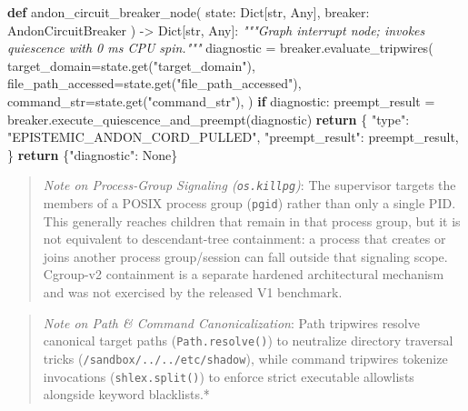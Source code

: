 \documentclass[
  10pt,letterpaper]{article}
\newenvironment{Shaded}{}{}
\newcommand{\BuiltInTok}[1]{\textcolor[rgb]{0.00,0.50,0.00}{#1}}
\newcommand{\CommentTok}[1]{\textcolor[rgb]{0.38,0.63,0.69}{\textit{#1}}}
\newcommand{\ControlFlowTok}[1]{\textcolor[rgb]{0.00,0.44,0.13}{\textbf{#1}}}
\newcommand{\KeywordTok}[1]{\textcolor[rgb]{0.00,0.44,0.13}{\textbf{#1}}}
\newcommand{\NormalTok}[1]{#1}
\newcommand{\OperatorTok}[1]{\textcolor[rgb]{0.40,0.40,0.40}{#1}}
\newcommand{\StringTok}[1]{\textcolor[rgb]{0.25,0.44,0.63}{#1}}
\newcommand{\VariableTok}[1]{\textcolor[rgb]{0.10,0.09,0.49}{#1}}
\begin{document}
\begin{Shaded}
\begin{Highlighting}[]
\KeywordTok{def}\NormalTok{ andon\_circuit\_breaker\_node(}
\NormalTok{    state: Dict[}\BuiltInTok{str}\NormalTok{, Any], breaker: AndonCircuitBreaker}
\NormalTok{) }\OperatorTok{{-}\textgreater{}}\NormalTok{ Dict[}\BuiltInTok{str}\NormalTok{, Any]:}
    \CommentTok{"""Graph interrupt node; invokes quiescence with 0 ms CPU spin."""}
\NormalTok{    diagnostic }\OperatorTok{=}\NormalTok{ breaker.evaluate\_tripwires(}
\NormalTok{        target\_domain}\OperatorTok{=}\NormalTok{state.get(}\StringTok{"target\_domain"}\NormalTok{),}
\NormalTok{        file\_path\_accessed}\OperatorTok{=}\NormalTok{state.get(}\StringTok{"file\_path\_accessed"}\NormalTok{),}
\NormalTok{        command\_str}\OperatorTok{=}\NormalTok{state.get(}\StringTok{"command\_str"}\NormalTok{),}
\NormalTok{    )}
    \ControlFlowTok{if}\NormalTok{ diagnostic:}
\NormalTok{        preempt\_result }\OperatorTok{=}\NormalTok{ breaker.execute\_quiescence\_and\_preempt(diagnostic)}
        \ControlFlowTok{return}\NormalTok{ \{}
            \StringTok{"type"}\NormalTok{: }\StringTok{"EPISTEMIC\_ANDON\_CORD\_PULLED"}\NormalTok{,}
            \StringTok{"preempt\_result"}\NormalTok{: preempt\_result,}
\NormalTok{        \}}
    \ControlFlowTok{return}\NormalTok{ \{}\StringTok{"diagnostic"}\NormalTok{: }\VariableTok{None}\NormalTok{\}}
\end{Highlighting}
\end{Shaded}

\begin{quote}
\emph{Note on Process-Group Signaling (\texttt{os.killpg})}: The
supervisor targets the members of a POSIX process group (\texttt{pgid})
rather than only a single PID. This generally reaches children that remain
in that process group, but it is not equivalent to descendant-tree
containment: a process that creates or joins another process group/session
can fall outside that signaling scope. Cgroup-v2 containment is a separate
hardened architectural mechanism and was not exercised by the released V1
benchmark.
\end{quote}

\begin{quote}
\emph{Note on Path \& Command Canonicalization}: Path tripwires resolve
canonical target paths (\texttt{Path.resolve()}) to neutralize directory
traversal tricks (\texttt{/sandbox/../../etc/shadow}), while command
tripwires tokenize invocations (\texttt{shlex.split()}) to enforce
strict executable allowlists alongside keyword blacklists.*
\end{quote}
\end{document}
